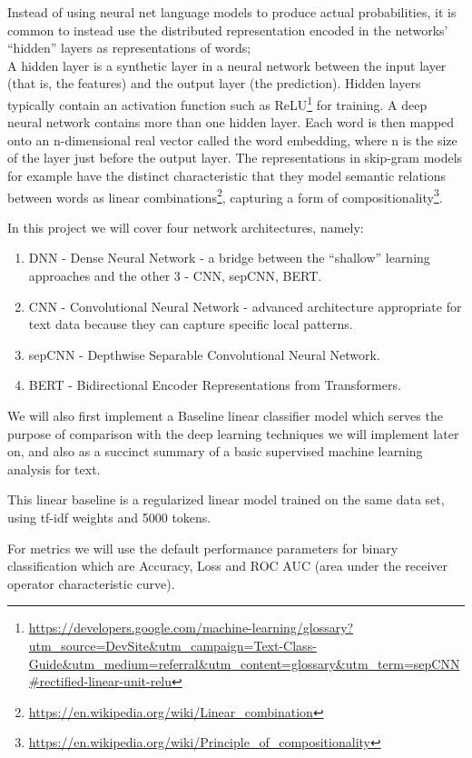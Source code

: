 \documentclass[
]{article}
\DeclareRobustCommand{\href}[2]{#2\footnote{\url{#1}}}
\begin{document}
Instead of using neural net language models to produce actual
probabilities, it is common to instead use the distributed
representation encoded in the networks' ``hidden'' layers as
representations of words;\\
A hidden layer is a synthetic layer in a neural network between the
input layer (that is, the features) and the output layer (the
prediction). Hidden layers typically contain an activation function such
as
\href{https://developers.google.com/machine-learning/glossary?utm_source=DevSite\&utm_campaign=Text-Class-Guide\&utm_medium=referral\&utm_content=glossary\&utm_term=sepCNN\#rectified-linear-unit-relu}{ReLU}
for training. A deep neural network contains more than one hidden layer.
Each word is then mapped onto an n-dimensional real vector called the
word embedding, where n is the size of the layer just before the output
layer. The representations in skip-gram models for example have the
distinct characteristic that they model semantic relations between words
as \href{https://en.wikipedia.org/wiki/Linear_combination}{linear
combinations}, capturing a form of
\href{https://en.wikipedia.org/wiki/Principle_of_compositionality}{compositionality}.

In this project we will cover four network architectures, namely:

\begin{enumerate}
\def\labelenumi{\arabic{enumi}.}
\item
  DNN - Dense Neural Network - a bridge between the ``shallow'' learning
  approaches and the other 3 - CNN, sepCNN, BERT.
\item
  CNN - Convolutional Neural Network - advanced architecture appropriate
  for text data because they can capture specific local patterns.
\item
  sepCNN - Depthwise Separable Convolutional Neural Network.
\item
  BERT - Bidirectional Encoder Representations from Transformers.
\end{enumerate}

We will also first implement a Baseline linear classifier model which
serves the purpose of comparison with the deep learning techniques we
will implement later on, and also as a succinct summary of a basic
supervised machine learning analysis for text.

This linear baseline is a regularized linear model trained on the same
data set, using tf-idf weights and 5000 tokens.

For metrics we will use the default performance parameters for binary
classification which are Accuracy, Loss and ROC AUC (area under the
receiver operator characteristic curve).
\end{document}
